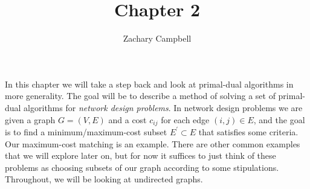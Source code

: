 \documentclass[11pt]{article}
\renewcommand{\'}{^{'}}
\begin{document}
\title{Chapter 2}
\author{Zachary Campbell}

\maketitle
	In this chapter we will take a step back and look at primal-dual algorithms in more generality. 
	The goal will be to describe a method of solving a set of primal-dual algorithms for 
	\emph{network design problems}. In network design problems we are given a graph $G = (V, E)$ 
	and a cost $c_{ij}$ for each edge $(i,j)\in E$, and the goal is to find a minimum/maximum-cost 
	subset 
	$E\' \subset E$ that satisfies some criteria. Our maximum-cost matching is an example. There 
	are other common examples that we will explore later on, but for now it suffices to just think 
	of these problems as choosing subsets of our graph according to some stipulations. Throughout, 
	we will be looking at undirected graphs.
\end{document}
